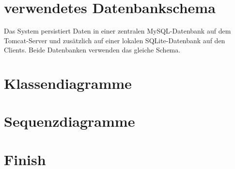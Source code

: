 


\section{verwendetes Datenbankschema}
Das System persistiert Daten in einer zentralen MySQL-Datenbank auf dem Tomcat-Server und zusätzlich auf einer lokalen SQLite-Datenbank auf den Clients. Beide Datenbanken verwenden das gleiche Schema.\\


\section{Klassendiagramme}

\section{Sequenzdiagramme}

\section{Finish}{

}

